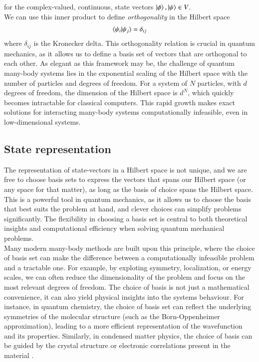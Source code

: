 \documentclass{subfiles}
\begin{document}
for the complex-valued, continuous, state vectors $\ket{\phi}, \ket{\psi} \in V$. \\ We can use this inner product to define \emph{orthogonality} in the Hilbert space
\begin{align*}
    \braket{\psi_i|\psi_j} = \delta_{ij}
\end{align*}
where $\delta_{ij}$ is the Kronecker delta. This orthogonality relation is crucial in quantum mechanics, as it allows us to define a basis set of vectors that are orthogonal to each other. As elegant as this framework may be, the challenge of quantum many-body systems lies in the exponential scaling of the Hilbert space with the number of particles and degrees of freedom. For a system of $N$ particles, with $d$ degrees of freedom, the dimension of the Hilbert space is $d^N$, which quickly becomes intractable for classical computers. This rapid growth makes exact solutions for interacting many-body systems computationally infeasible, even in low-dimensional systems.

\subsection{State representation}\label{sec:state_representation}
The representation of state-vectors in a Hilbert space is not unique, and we are free to choose basis sets to express the vectors that spans our Hilbert space (or any space for that matter), as long as the basis of choice spans the Hilbert space\cite{griffiths2018introduction, berera2021quantum}. This is a powerful tool in quantum mechanics, as it allows us to choose the basis that best suits the problem at hand, and clever choices can simplify problems significantly. The flexibility in choosing a basis set is central to both theoretical insights and computational efficiency when solving quantum mechanical problems. \\

Many modern many-body methods are built upon this principle, where the choice of basis set can make the difference between a computationally infeasible problem and a tractable one. For example, by exploting symmetry, localization, or energy scales, we can often reduce the dimensionality of the problem and focus on the most relevant degrees of freedom. The choice of basis is not just a mathematical convenience, it can also yield physical insights into the systems behaviour. For instance, in quantum chemistry, the choice of basis set can reflect the underlying symmetries of the molecular structure (such as the Born-Oppenheimer approximation)\cite{szabo1996modern}, leading to a more efficient representation of the wavefunction and its properties. Similarly, in condensed matter physics, the choice of basis can be guided by the crystal structure or electronic correlations present in the material \cite{baroni2001phonons, kittel2018introduction}. \\
\end{document}
